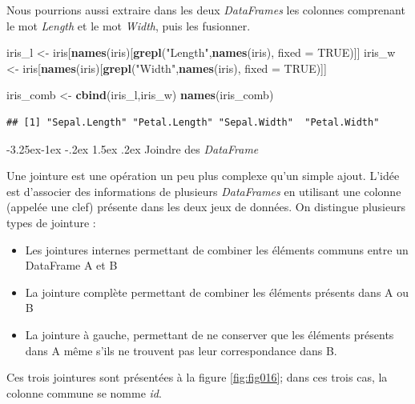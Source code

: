 \documentclass[
  11pt,
  french,
]{book}
\makeatletter
\newenvironment{Shaded}{\begin{snugshade}}{\end{snugshade}}
\newcommand{\DataTypeTok}[1]{\textcolor[rgb]{0.13,0.29,0.53}{#1}}
\newcommand{\KeywordTok}[1]{\textcolor[rgb]{0.13,0.29,0.53}{\textbf{#1}}}
\newcommand{\NormalTok}[1]{#1}
\newcommand{\OtherTok}[1]{\textcolor[rgb]{0.56,0.35,0.01}{#1}}
\newcommand{\StringTok}[1]{\textcolor[rgb]{0.31,0.60,0.02}{#1}}
\providecommand{\tightlist}{%
  \setlength{\itemsep}{0pt}\setlength{\parskip}{0pt}}
\newenvironment{kframe}{%
\medskip{}
\setlength{\fboxsep}{.8em}
 \def\at@end@of@kframe{}%
 \ifinner\ifhmode%
  \def\at@end@of@kframe{\end{minipage}}%
  \begin{minipage}{\columnwidth}%
 \fi\fi%
 \def\FrameCommand##1{\hskip\@totalleftmargin \hskip-\fboxsep
 \colorbox{shadecolor}{##1}\hskip-\fboxsep
     \hskip-\linewidth \hskip-\@totalleftmargin \hskip\columnwidth}%
 \MakeFramed {\advance\hsize-\width
   \@totalleftmargin\z@ \linewidth\hsize
   \@setminipage}}%
 {\par\unskip\endMakeFramed%
 \at@end@of@kframe}
\renewenvironment{Shaded}{\begin{kframe}}{\end{kframe}}
\renewcommand\paragraph{\@startsection{paragraph}{4}{\z@}%
   {-3.25ex\@plus -1ex \@minus -.2ex}%
   {1.5ex \@plus .2ex}%
   {\normalfont\normalsize\bfseries}}
\makeatother
\begin{document}
Nous pourrions aussi extraire dans les deux \emph{DataFrames} les colonnes comprenant le mot \emph{Length} et le mot \emph{Width}, puis les fusionner.

\begin{Shaded}
\begin{Highlighting}[]
\NormalTok{iris_l <-}\StringTok{ }\NormalTok{iris[}\KeywordTok{names}\NormalTok{(iris)[}\KeywordTok{grepl}\NormalTok{(}\StringTok{"Length"}\NormalTok{,}\KeywordTok{names}\NormalTok{(iris), }\DataTypeTok{fixed =} \OtherTok{TRUE}\NormalTok{)]]}
\NormalTok{iris_w <-}\StringTok{ }\NormalTok{iris[}\KeywordTok{names}\NormalTok{(iris)[}\KeywordTok{grepl}\NormalTok{(}\StringTok{"Width"}\NormalTok{,}\KeywordTok{names}\NormalTok{(iris), }\DataTypeTok{fixed =} \OtherTok{TRUE}\NormalTok{)]]}

\NormalTok{iris_comb <-}\StringTok{ }\KeywordTok{cbind}\NormalTok{(iris_l,iris_w)}
\KeywordTok{names}\NormalTok{(iris_comb)}
\end{Highlighting}
\end{Shaded}

\begin{verbatim}
## [1] "Sepal.Length" "Petal.Length" "Sepal.Width"  "Petal.Width"
\end{verbatim}

\hypertarget{sect014292}{%
\paragraph{\texorpdfstring{Joindre des \emph{DataFrame}}{Joindre des DataFrame}}\label{sect014292}}

Une jointure est une opération un peu plus complexe qu'un simple ajout. L'idée est d'associer des informations de plusieurs \emph{DataFrames} en utilisant une colonne (appelée une clef) présente dans les deux jeux de données. On distingue plusieurs types de jointure :

\begin{itemize}
\tightlist
\item
  Les jointures internes permettant de combiner les éléments communs entre un DataFrame A et B
\item
  La jointure complète permettant de combiner les éléments présents dans A ou B
\item
  La jointure à gauche, permettant de ne conserver que les éléments présents dans A même s'ils ne trouvent pas leur correspondance dans B.
\end{itemize}

Ces trois jointures sont présentées à la figure \ref{fig:fig016}; dans ces trois cas, la colonne commune se nomme \emph{id}.
\end{document}
